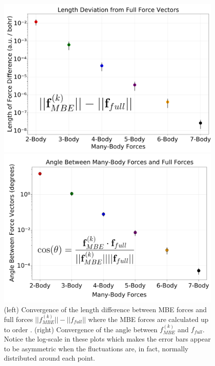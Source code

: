 \begin{figure}[t]
\uwsinglespace
\begin{center}
\begin{minipage}{0.45\textwidth}
\includegraphics[width=\textwidth]{Figures/Chapter_4/ch4_figure_6_top.png}
\end{minipage}
\begin{minipage}{0.45\textwidth}
\includegraphics[width=\textwidth]{Figures/Chapter_4/ch4_figure_6_bottom.png}
\end{minipage}
\end{center}
\begin{spacing}{1.0}
\caption[(Convergence of the length difference between MBE forces and full forces $||f^{(k)}_{MBE}||-||f_{full}||$ where the MBE forces are calculated up to order . (6b, right) Convergence of the angle between $f^{(k)}_{MBE}$ and $f_{full}$.]{(left) Convergence of the length difference between MBE forces and full forces $||f^{(k)}_{MBE}||-||f_{full}||$ where the MBE forces are calculated up to order . (right) Convergence of the angle between $f^{(k)}_{MBE}$ and $f_{full}$. Notice the log-scale in these plots which makes the error bars appear to be asymmetric when the fluctuations are, in fact, normally distributed around each point.}\label{fig:MBE_MD_F6}
\end{spacing}
\end{figure}